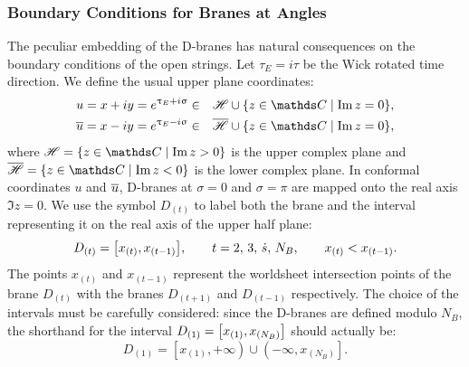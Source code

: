 \subsubsection{Boundary Conditions for Branes at Angles}

The peculiar embedding of the D-branes has natural consequences on the boundary conditions of the open strings.
Let $\tau_E = i \tau$ be the Wick rotated time direction.
We define the usual upper plane coordinates:
\begin{eqnarray}
  u
  =
  x + i y
  =
  e^{\tau_E + i \sigma}
  & \in &
  \ccH \cup \qty{ z \in \C \mid \Im z = 0 },
  \\
  \baru
  =
  x - i y
  =
  e^{\tau_E - i \sigma}
  & \in &
  \bccH \cup \qty{ z \in \C \mid \Im z = 0 },
\end{eqnarray}
where $\ccH = \qty{ z \in \C \mid \Im z > 0 }$ is the upper complex plane and $\bccH = \qty{ z \in \C \mid \Im z < 0 }$ is the lower complex plane.
In conformal coordinates $u$ and $\overline{u}$, D-branes at $\sigma = 0$ and $\sigma = \pi$ are mapped onto the real axis $\Im z = 0$.
We use the symbol $D_{(t)}$ to label both the brane and the interval representing it on the real axis of the upper half plane:
\begin{equation}
  D_{(t)} = \qty[ x_{(t)}, x_{(t-1)} ],
  \qquad
  t = 2,\, 3,\, \dot{s},\, N_B,
  \qquad
  x_{(t)} < x_{(t-1)}.
\end{equation}
The points $x_{(t)}$ and $x_{(t-1)}$ represent the worldsheet intersection points of the brane $D_{(t)}$ with the branes $D_{(t+1)}$ and $D_{(t-1)}$ respectively.
The choice of the intervals must be carefully considered: since the D-branes are defined modulo $N_B$, the shorthand for the interval $D_{(1)} = \qty[ x_{(1)}, x_{(N_B)} ]$ should actually be:
\begin{equation}
  D_{(1)}
  =
  \left[ x_{(1)}, +\infty \right) \cup \left( -\infty, x_{(N_B)} \right].
\end{equation}

